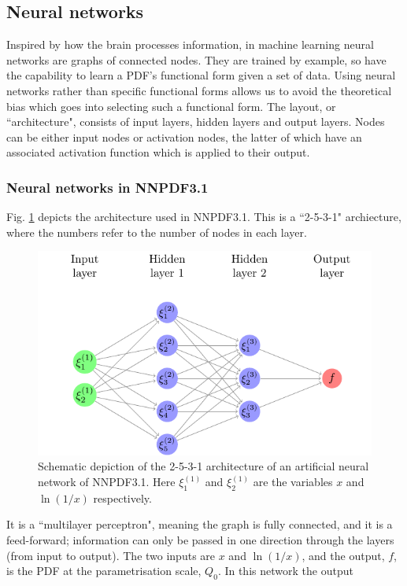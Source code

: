 \subsection{Neural networks}

Inspired by how the brain processes information, in machine learning neural networks are graphs of connected nodes. They are trained by example, so
have the capability to learn a PDF's functional form given a set of data. Using neural networks rather than specific functional forms allows us to avoid the theoretical bias which goes into selecting such a functional form. The layout, or ``architecture", consists
of input layers, hidden layers and output layers. Nodes can be either input nodes or activation nodes, the latter of which have an associated activation function which is applied to their output. 
\subsubsection{Neural networks in NNPDF3.1}
Fig. \ref{fig:nn} depicts the architecture used in NNPDF3.1. This is a ``2-5-3-1" archiecture, where the numbers refer to the number of nodes in each layer. 
\begin{figure}[h]
\centering
\includegraphics[width=\textwidth]{../diagrams/neuralnet.pdf}
\caption{Schematic depiction of the 2-5-3-1 architecture of an artificial neural network of NNPDF3.1. Here $\xi_1^{(1)}$ and $\xi_2^{(1)}$ are the variables $x$ and $\ln (1/x)$ respectively. \label{fig:nn}}
\end{figure}
It is a ``multilayer perceptron", meaning the graph is fully connected, and it is a feed-forward; information can only be passed in one direction through the layers (from 
input to output). The two inputs are $x$ and $\ln (1/x)$, and the output, $f$, is the PDF at the parametrisation scale, $Q_0$. In this network the output
